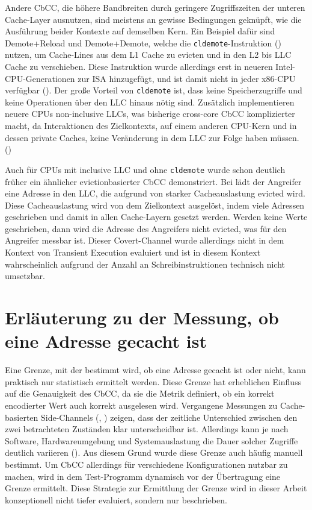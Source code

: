 Andere \ac{CbCC}, die höhere Bandbreiten durch geringere
Zugriffszeiten der unteren Cache-Layer ausnutzen, sind meistens
an gewisse Bedingungen geknüpft, wie die Ausführung beider Kontexte
auf demselben Kern. Ein Beispiel dafür sind Demote+Reload und
Demote+Demote, welche die \verb|cldemote|-Instruktion
(\cite{noauthor_cldemote_2023}) nutzen, um Cache-Lines aus dem
L1 Cache zu evicten und in den L2 bis \ac{LLC} Cache zu verschieben.
Diese Instruktion wurde allerdings erst in neueren
Intel-\ac{CPU}-Generationen zur \ac{ISA} hinzugefügt, und ist damit
nicht in jeder x86-\ac{CPU} verfügbar (\cite{noauthor_list_2026}).
Der große Vorteil von \verb|cldemote| ist, dass keine Speicherzugriffe
und keine Operationen über den \ac{LLC} hinaus nötig sind.
Zusätzlich implementieren neuere \acp{CPU} non-inclusive \acp{LLC},
was bisherige cross-core \ac{CbCC} komplizierter macht, da
Interaktionen des Zielkontexts, auf einem anderen \ac{CPU}-Kern
und in dessen private Caches, keine Veränderung in dem \ac{LLC}
zur Folge haben müssen. (\cite[3,4]{rauscher_systematic_2025})

Auch für \acp{CPU} mit inclusive \ac{LLC} und ohne \verb|cldemote|
wurde schon deutlich früher ein ähnlicher evictionbasierter
\ac{CbCC} demonstriert. Bei \cite[6,7]{almgren_c5_2015} lädt der
Angreifer eine Adresse in den \ac{LLC}, die aufgrund von starker
Cacheauslastung evicted wird. Diese Cacheauslastung wird von dem
Zielkontext ausgelöst, indem viele Adressen geschrieben und damit
in allen Cache-Layern gesetzt werden. Werden keine Werte
geschrieben, dann wird die Adresse des Angreifers nicht evicted,
was für den Angreifer messbar ist. Dieser Covert-Channel wurde
allerdings nicht in dem Kontext von Transient Execution evaluiert
und ist in diesem Kontext wahrscheinlich aufgrund der Anzahl an
Schreibinstruktionen technisch nicht umsetzbar.

\section{Erläuterung zu der Messung, ob eine Adresse gecacht ist}
\label{appendix:explanation-on-cache-measurements}
Eine Grenze, mit der bestimmt wird, ob eine
Adresse gecacht ist oder nicht, kann praktisch nur statistisch
ermittelt werden. Diese Grenze hat erheblichen Einfluss auf die
Genauigkeit des \ac{CbCC}, da sie die Metrik definiert, ob ein
korrekt encodierter Wert auch korrekt ausgelesen wird.
Vergangene Messungen zu Cache-basierten Side-Channels
(\cite[6,7]{yarom_flushreload_2014}, \cite[5-7]{rauscher_systematic_2025})
zeigen, dass der zeitliche Unterschied zwischen den zwei
betrachteten Zuständen klar unterscheidbar ist. Allerdings kann
je nach Software, Hardwareumgebung und Systemauslastung
die Dauer solcher Zugriffe deutlich variieren
(\cite[7]{yarom_flushreload_2014}). Aus diesem Grund wurde diese
Grenze auch häufig manuell bestimmt. Um \ac{CbCC} allerdings für
verschiedene Konfigurationen nutzbar zu machen, wird
in dem Test-Programm dynamisch vor der Übertragung eine
Grenze ermittelt. Diese Strategie zur Ermittlung der Grenze wird in
dieser Arbeit konzeptionell nicht tiefer evaluiert, sondern nur
beschrieben.

